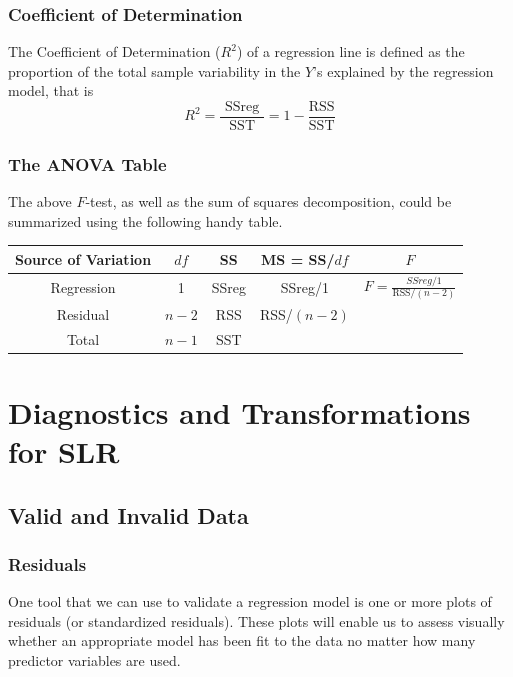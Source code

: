 \documentclass[11pt]{article}
\begin{document}
\subsubsection{Coefficient of Determination}
The Coefficient of Determination ($R^2$) of a regression line is defined as the proportion of the total sample variability in the $Y$'s explained by the regression model, that is
\begin{equation*}
    R^{2}=\frac{\text { SSreg }}{\mathrm{SST}}=1-\frac{\mathrm{RSS}}{\mathrm{SST}}
\end{equation*}

\subsubsection{The ANOVA Table}
The above $F$-test, as well as the sum of squares decomposition, could be summarized using the following handy table. 
\begin{center}
    \begin{tabular}{|c||c|c|c|c|}
        \hline
        Source of Variation & $df$    & SS    & MS = SS/$df$& $F$                                      \\ \hline \hline
        Regression          & 1     & SSreg & SSreg/1     & $F = \frac{SSreg/1}{\text{RSS}/(n-2)}$ \\ \hline
        Residual            & $n-2$ & RSS   & RSS/$(n-2)$ &                                        \\ \hline
        Total               & $n-1$ & SST   &             &                                        \\ \hline
    \end{tabular}
\end{center}


\section{Diagnostics and Transformations for SLR}
\subsection{Valid and Invalid Data}
\subsubsection{Residuals}
One tool that we can use to validate a regression model is one or more plots of residuals (or standardized residuals). These plots will enable us to assess visually whether an appropriate model has been fit to the data no matter how many predictor variables are used. 
\end{document}
